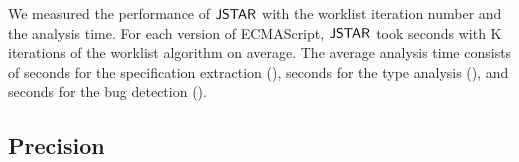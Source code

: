 We measured the performance of $\tool$ with the worklist iteration number
and the analysis time.  For each version of ECMAScript,
$\tool$ took  seconds with K iterations of
the worklist algorithm on average.  The average analysis time consists of  seconds
for the specification extraction (),
 seconds for the type analysis (), and
 seconds for the bug detection ().


\subsection{Precision}\label{sec:precision}

% 
% 
% 

